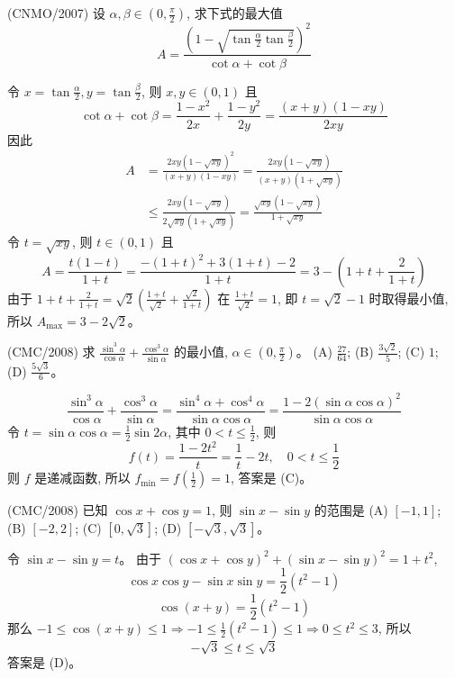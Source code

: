 \begin{questions}
\question (CNMO/2007) 设 $\alpha, \beta \in \left( 0, \frac{\pi}{2} \right)$, 求下式的最大值
\[
A = \frac{\left( 1 - \sqrt{\tan \frac{\alpha}{2} \tan \frac{\beta}{2}} \right)^2}{\cot \alpha + \cot \beta}
\]

\begin{solution}
令 $x = \tan \frac{\alpha}{2}, y = \tan \frac{\beta}{2}$, 则 $x, y \in (0, 1)$ 且
\[
\cot \alpha + \cot \beta = \frac{1 - x^2}{2x} + \frac{1 - y^2}{2y} = \frac{(x + y)(1 - xy)}{2xy}
\]
因此
\begin{align*}
A &= \frac{2xy(1 - \sqrt{xy})^2}{(x + y)(1 - xy)} = \frac{2xy(1 - \sqrt{xy})}{(x + y)(1 + \sqrt{xy})} \\
&\le \frac{2xy(1 - \sqrt{xy})}{2\sqrt{xy}(1 + \sqrt{xy})} = \frac{\sqrt{xy}(1 - \sqrt{xy})}{1 + \sqrt{xy}}
\end{align*}
令 $t = \sqrt{xy}$, 则 $t \in (0, 1)$ 且
\[
A = \frac{t(1 - t)}{1 + t} = \frac{-(1 + t)^2 + 3(1 + t) - 2}{1 + t} = 3 - \left( 1 + t + \frac{2}{1 + t} \right)
\]
由于 $1 + t + \frac{2}{1 + t} = \sqrt{2} \left( \frac{1 + t}{\sqrt{2}} + \frac{\sqrt{2}}{1 + t} \right)$ 在 $\frac{1 + t}{\sqrt{2}} = 1$, 即 $t = \sqrt{2} - 1$ 时取得最小值, 所以 $A_{\max} = 3 - 2\sqrt{2}$。
\end{solution}

\question (CMC/2008) 求 $\frac{\sin^3 \alpha}{\cos \alpha} + \frac{\cos^3 \alpha}{\sin \alpha}$ 的最小值, $\alpha \in \left( 0, \frac{\pi}{2} \right)$。
(A) $\frac{27}{64}$; (B) $\frac{3\sqrt{2}}{5}$; (C) $1$; (D) $\frac{5\sqrt{3}}{6}$。

\begin{solution}
\[
\frac{\sin^3 \alpha}{\cos \alpha} + \frac{\cos^3 \alpha}{\sin \alpha} = \frac{\sin^4 \alpha + \cos^4 \alpha}{\sin \alpha \cos \alpha} = \frac{1 - 2(\sin \alpha \cos \alpha)^2}{\sin \alpha \cos \alpha}
\]
令 $t = \sin \alpha \cos \alpha = \frac{1}{2} \sin 2\alpha$, 其中 $0 < t \le \frac{1}{2}$, 则
\[
f(t) = \frac{1 - 2t^2}{t} = \frac{1}{t} - 2t, \quad 0 < t \le \frac{1}{2}
\]
则 $f$ 是递减函数, 所以 $f_{\min} = f \left( \frac{1}{2} \right) = 1$, 答案是 (C)。
\end{solution}



\question (CMC/2008) 已知 $\cos x + \cos y = 1$, 则 $\sin x - \sin y$ 的范围是
(A) $[-1, 1]$; (B) $[-2, 2]$; (C) $[0, \sqrt{3}]$; (D) $[-\sqrt{3}, \sqrt{3}]$。

\begin{solution}
令 $\sin x - \sin y = t$。
由于 $(\cos x + \cos y)^2 + (\sin x - \sin y)^2 = 1 + t^2$,
\[
\cos x \cos y - \sin x \sin y = \frac{1}{2}(t^2 - 1)
\]
\[
\cos(x + y) = \frac{1}{2}(t^2 - 1)
\]
那么 $-1 \le \cos(x + y) \le 1 \Rightarrow -1 \le \frac{1}{2}(t^2 - 1) \le 1 \Rightarrow 0 \le t^2 \le 3$, 所以
\[
-\sqrt{3} \le t \le \sqrt{3}
\]
答案是 (D)。
\end{solution}


\end{questions}
